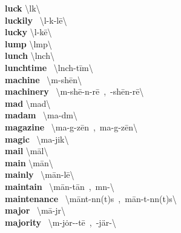 \documentclass[10pt,a4paper]{article}
\begin{document}
\begin{multicols}{2}
\textbf{ luck }\quad \textbackslash \textprimstress l\textschwa k\textbackslash \\
\textbf{ luckily }\quad \ \textbackslash \textprimstress l\textschwa -k\textschwa -l\={e}\textbackslash \\
\textbf{ lucky }\quad \textbackslash \textprimstress l\textschwa -k\={e}\textbackslash \\
\textbf{ lump }\quad \textbackslash \textprimstress l\textschwa mp\textbackslash \\
\textbf{ lunch }\quad \textbackslash \textprimstress l\textschwa nch\textbackslash \\
\textbf{ lunchtime }\quad \ \textbackslash \textprimstress l\textschwa nch-\textsecstress t\={i}m\textbackslash \\
\textbf{ machine }\quad \ \textbackslash m\textschwa -\textprimstress sh\={e}n\textbackslash \\
\textbf{ machinery }\quad \ \textbackslash m\textschwa -\textprimstress sh\={e}-n\textschwa -r\={e}\ ,\ -\textprimstress sh\={e}n-r\={e}\textbackslash \\
\textbf{ mad }\quad \textbackslash \textprimstress mad\textbackslash \\
\textbf{ madam }\quad \ \textbackslash \textprimstress ma-d\textschwa m\textbackslash \\
\textbf{ magazine }\quad \ \textbackslash \textprimstress ma-g\textschwa -\textsecstress z\={e}n\ ,\ \textsecstress ma-g\textschwa -\textprimstress z\={e}n\textbackslash \\
\textbf{ magic }\quad \ \textbackslash \textprimstress ma-jik\textbackslash \\
\textbf{ mail }\quad \textbackslash \textprimstress m\={a}l\textbackslash \\
\textbf{ main }\quad \textbackslash \textprimstress m\={a}n\textbackslash \\
\textbf{ mainly }\quad \ \textbackslash \textprimstress m\={a}n-l\={e}\textbackslash \\
\textbf{ maintain }\quad \ \textbackslash m\={a}n-\textprimstress t\={a}n\ ,\ m\textschwa n-\textbackslash \\
\textbf{ maintenance }\quad \ \textbackslash \textprimstress m\={a}nt-n\textschwa n(t)s\ ,\ \textprimstress m\={a}n-t\textschwa -n\textschwa n(t)s\textbackslash \\
\textbf{ major }\quad \ \textbackslash \textprimstress m\={a}-j\textschwa r\textbackslash \\
\textbf{ majority }\quad \ \textbackslash m\textschwa -\textprimstress j\.{o}r-\textschwa -t\={e}\ ,\ -\textprimstress j\"{a}r-\textbackslash \\

\end{multicols}
\end{document}

